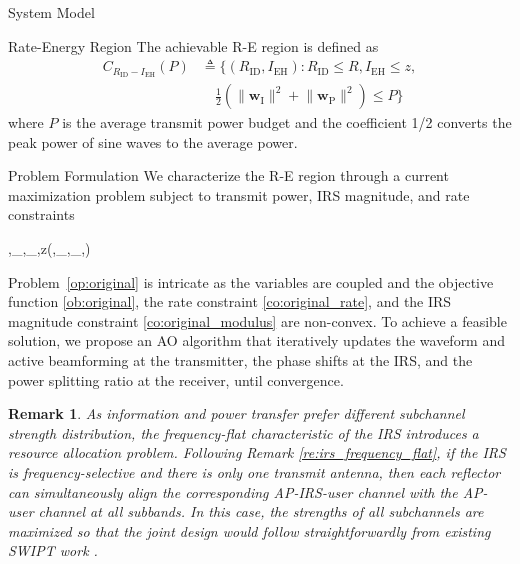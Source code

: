 \documentclass[journal]{IEEEtran}
\newtheorem{remark}{Remark}
\begin{document}
\begin{section}{System Model}
		\begin{subsection}{Rate-Energy Region}
			The achievable R-E region is defined as
			\begin{align}
				C_{R_{\text{ID}}-I_{\text{EH}}}(P)
				&\triangleq \biggl\{(R_{\text{ID}}, I_{\text{EH}}): R_{\text{ID}} \le R, I_{\text{EH}} \le z,\nonumber\\
				&\quad \frac{1}{2}\left(\lVert{\boldsymbol{w}_{\text{I}}}\rVert^2+\lVert{\boldsymbol{w}_\text{P}}\rVert^2\right) \le P\biggr\}
			\end{align}
			where $P$ is the average transmit power budget and the coefficient \num{1/2} converts the peak power of sine waves to the average power.
		\end{subsection}
	\end{section}


	\begin{section}{Problem Formulation}\label{se:problem_formulation}
		We characterize the R-E region through a current maximization problem subject to transmit power, IRS magnitude, and rate constraints
		\begin{maxi!}
			{\boldsymbol{\phi},_{},_,\rho}{z(\boldsymbol{\phi},_{},_,\rho)}{\label{op:original}}{\label{ob:original}}
			\label{co:original_power}
			\label{co:original_rate}
			\label{co:original_modulus}
		\end{maxi!}
		Problem~\eqref{op:original} is intricate as the variables are coupled and the objective function \eqref{ob:original}, the rate constraint \eqref{co:original_rate}, and the IRS magnitude constraint \eqref{co:original_modulus} are non-convex. To achieve a feasible solution, we propose an AO algorithm that iteratively updates the waveform and active beamforming at the transmitter, the phase shifts at the IRS, and the power splitting ratio at the receiver, until convergence.
		\begin{remark}\label{re:irs_subchannel_alignment}
			As information and power transfer prefer different subchannel strength distribution, the frequency-flat characteristic of the IRS introduces a resource allocation problem. Following Remark \ref{re:irs_frequency_flat}, if the IRS is frequency-selective and there is only one transmit antenna, then each reflector can simultaneously align the corresponding AP-IRS-user channel with the AP-user channel at all subbands. In this case, the strengths of all subchannels are maximized so that the joint design would follow straightforwardly from existing SWIPT work \cite{Clerckx2018b}.
		\end{remark}



\end{section}
\end{document}
